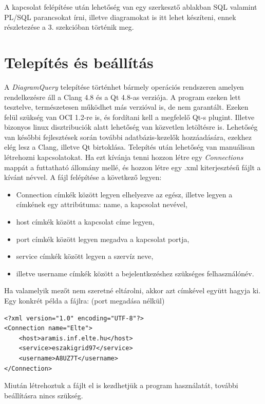 \documentclass{elteikthesis}
\begin{document}
A kapcsolat felépítése után lehetőség van egy szerkesztő ablakban SQL valamint PL/SQL parancsokat írni, illetve
diagramokat is itt lehet készíteni, ennek részletezése a 3. szekcióban történik meg.

\section{Telepítés és beállítás}
A \textit{DiagramQuery} telepítése történhet bármely operációs rendszeren amelyen rendelkezésre áll a Clang 4.8 és a Qt 4.8-as verziója. A program ezeken lett tesztelve, természetesen működhet más verzióval is, de nem garantált. Ezeken felül szükség van OCI 1.2-re is, és fordítani kell a megfelelő Qt-s plugint.
Illetve bizonyos linux disztribuciók alatt lehetőség van közvetlen letöltésre is. Lehetőség van későbbi fejlesztések során további adatbázis-kezelők hozzáadására, ezekhez elég lesz a Clang, illetve Qt birtoklása.
Telepítés után lehetőség van manuálisan létrehozni kapcsolatokat. Ha ezt kívánja tenni hozzon létre egy \textit{Connections} mappát a futtatható állomány mellé, és hozzon létre egy .xml kiterjesztésű fájlt a kívánt névvel. A fájl felépítése a következő legyen:
\begin{itemize}
  \item Connection címkék között legyen elhelyezve az egész, illetve legyen a címkének egy attribútuma: name, a kapcsolat nevével,
  \item host címkék között a kapcsolat címe legyen,
  \item port címkék között legyen megadva a kapcsolat portja,
  \item service címkék között legyen a szervíz neve,
  \item illetve username címkék között a bejelentkezéshez szükséges felhasználónév.
\end{itemize}
Ha valamelyik mezőt nem szeretné eltárolni, akkor azt címkével együtt hagyja ki.
Egy konkrét példa a fájlra: (port megadása nélkül)

\begin{lstlisting}
<?xml version="1.0" encoding="UTF-8"?>
<Connection name="Elte">
    <host>aramis.inf.elte.hu</host>
    <service>eszakigrid97</service>
    <username>A8UZ7T</username>
</Connection>
\end{lstlisting}

Miután létrehoztuk a fájlt el is kezdhetjük a program használatát, további beállításra nincs szükség.
\end{document}
